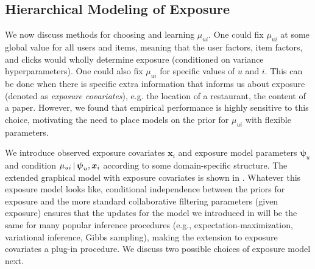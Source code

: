 \subsection{Hierarchical Modeling of Exposure}
\label{sec:modeling_mu}

We now discuss methods for choosing and learning $\mu_{ui}$. 
One could fix $\mu_{ui}$ 
at some global value for all users and items, 
meaning that the user factors, item factors, and clicks 
would wholly determine exposure (conditioned on variance hyperparameters). 
One could also fix $\mu_{ui}$ for specific values of $u$ and $i$. 
This can be done when there is specific extra information 
that informs us about exposure (denoted as \emph{exposure covariates}), e.g. the location of a restaurant, the content of a paper. 
However, we found that empirical performance is highly sensitive to this choice, 
motivating the need to place models on the prior for $\mu_{ui}$ 
with flexible parameters. 

We introduce observed exposure covariates $\mathbf{x}_i$ and exposure model parameters $\boldsymbol\psi_{u}$ 
and condition $\mu_{ui} \,\vert\, \boldsymbol{\psi}_{u}, \boldsymbol{x}_{i}$ 
according to some domain-specific structure. 
The extended graphical model with exposure covariates 
is shown in . 
Whatever this exposure model looks like, 
conditional independence between the priors for exposure 
and the more standard collaborative filtering parameters (given exposure) 
ensures that the updates for the model we introduced in 
will be the same for many popular inference procedures (e.g., expectation-maximization, variational inference, Gibbs sampling), 
making the extension to exposure covariates a plug-in procedure. 
We discuss two possible choices of exposure model next.

%
%

